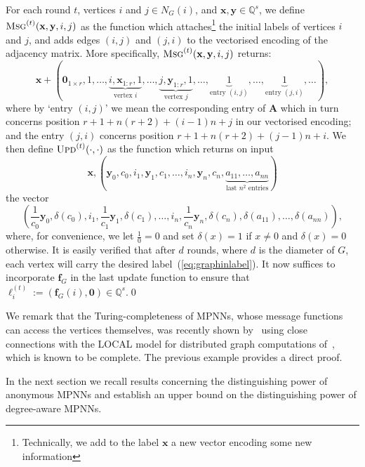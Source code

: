 \begin{example}
For each round $t$, vertices $i$ and $j\in N_G(i)$, and $\mathbf{x},\mathbf{y}\in\mathbb{Q}^s$, we define
$
\textsc{Msg}^{(t)}(\mathbf{x},\mathbf{y},i,j)
$
as the function which attaches\footnote{Technically, we add to the label $\textbf{x}$ a new vector encoding some new information} the initial labels of vertices $i$ and $j$, and adds edges $(i,j)$ and $(j,i)$ to the vectorised encoding of the adjacency matrix.
More specifically, $
\textsc{Msg}^{(t)}(\mathbf{x},\mathbf{y},i,j)
$ returns:
\[
\mathbf{x}+(\mathbf{0}_{1\times r},1,\ldots,\underbrace{i,\mathbf{x}_{1:r},1}_{\text{vertex $i$}},\ldots, \underbrace{j,\mathbf{y}_{1:r},1}_{\text{vertex $j$}},\ldots,\underbrace{1}_{\text{entry $(i,j)$}},\ldots,\underbrace{1}_{\text{entry $(j,i)$}},\ldots),
\]
where by `entry $(i,j)$' we mean the corresponding entry of $\mathbf{A}$ which in turn concerns position $r+1+n(r+2)+(i-1)n+j$ in our vectorised encoding;
and the entry $(j,i)$
concerns position $r+1+n(r+2)+(j-1)n+i$. We then define
$\textsc{Upd}^{(t)}(\cdot,\cdot)$ as the
function which returns on input 
\[
\mathbf{x}, \left(\mathbf{y}_0,c_0,i_1,\mathbf{y}_1,c_1,\ldots,i_n,\mathbf{y}_n,c_n, \underbrace{a_{11},\ldots,a_{nn}}_{\text{last $n^2$ entries}}\right)
\]
the vector
\[
\left(\frac{1}{c_0}\mathbf{y}_0,\delta(c_0),i_1,\frac{1}{c_1}\mathbf{y}_1,\delta(c_1),\ldots,
i_n,\frac{1}{c_n}\mathbf{y}_n,\delta(c_n),\delta(a_{11}),\ldots,\delta(a_{nn})\right),
\]
where, for convenience, we let $\frac{1}{0}=0$ and
set $\delta(x)=1$ if $x\neq 0$ and $\delta(x)=0$ otherwise. It is easily verified that after $d$ rounds, where $d$ is the diameter of $G$, each vertex will carry
the desired label~(\ref{eq:graphinlabel}). It now suffices to incorporate $\mathbf{f}_G$ in the last update function to ensure that $\pmb{\ell}_i^{(t)}:=(\mathbf{f}_G(i),\mathbf{0})\in\mathbb{Q}^s$.\qed
\end{example}
We remark that the Turing-completeness of MPNNs, whose message functions can access  the vertices themselves, was recently shown by~\cite{Loukas2019}  using close connections with the LOCAL model for distributed graph computations of~\cite{Angluin}, which is known to be complete. The previous example provides a direct proof.

In the next section we recall results concerning the distinguishing power of anonymous MPNNs and establish an upper bound on the distinguishing power of degree-aware MPNNs.

